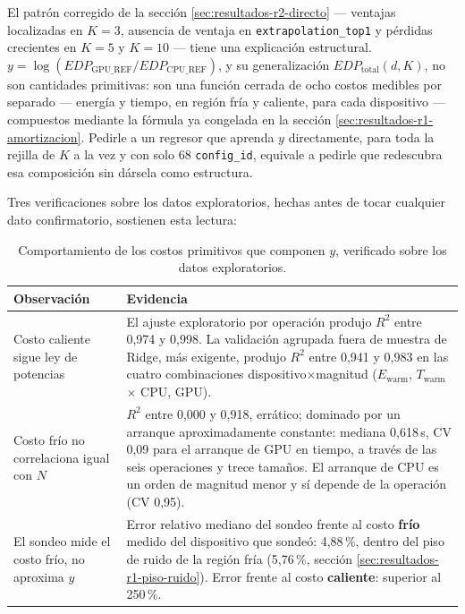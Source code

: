 \documentclass[12pt,oneside,spanish]{book}
\begin{document}
El patrón corregido de la sección \ref{sec:resultados-r2-directo} --- ventajas localizadas en $K=3$, ausencia de ventaja en \texttt{extrapolation\_top1} y pérdidas crecientes en $K=5$ y $K=10$ --- tiene una explicación estructural. $y = \log(EDP_{\text{GPU\_REF}}/EDP_{\text{CPU\_REF}})$, y su generalización $EDP_{\text{total}}(d,K)$, no son cantidades primitivas: son una función cerrada de ocho costos medibles por separado --- energía y tiempo, en región fría y caliente, para cada dispositivo --- compuestos mediante la fórmula ya congelada en la sección \ref{sec:resultados-r1-amortizacion}. Pedirle a un regresor que aprenda $y$ directamente, para toda la rejilla de $K$ a la vez y con solo 68 \texttt{config\_id}, equivale a pedirle que redescubra esa composición sin dársela como estructura.

Tres verificaciones sobre los datos exploratorios, hechas antes de tocar cualquier dato confirmatorio, sostienen esta lectura:

\begin{table}[H]
\centering
\caption[Evidencia del diagnóstico estructural]{Comportamiento de los costos primitivos que componen $y$, verificado sobre los datos exploratorios.}
\label{tab:r2-diagnostico}
\begin{tabular}{lp{9.5cm}}
\toprule
\textbf{Observación} & \textbf{Evidencia} \\
\midrule
Costo caliente sigue ley de potencias & El ajuste exploratorio por operación produjo $R^2$ entre 0,974 y 0,998. La validación agrupada fuera de muestra de Ridge, más exigente, produjo $R^2$ entre 0,941 y 0,983 en las cuatro combinaciones dispositivo$\times$magnitud ($E_{\text{warm}}$, $T_{\text{warm}}$ $\times$ CPU, GPU). \\
Costo frío no correlaciona igual con $N$ & $R^2$ entre 0,000 y 0,918, errático; dominado por un arranque aproximadamente constante: mediana 0,618\,s, CV 0,09 para el arranque de GPU en tiempo, a través de las seis operaciones y trece tamaños. El arranque de CPU es un orden de magnitud menor y sí depende de la operación (CV 0,95). \\
El sondeo mide el costo frío, no aproxima $y$ & Error relativo mediano del sondeo frente al costo \textbf{frío} medido del dispositivo que sondeó: 4,88\,\%, dentro del piso de ruido de la región fría (5,76\,\%, sección \ref{sec:resultados-r1-piso-ruido}). Error frente al costo \textbf{caliente}: superior al 250\,\%. \\
\bottomrule
\end{tabular}
\end{table}
\end{document}
